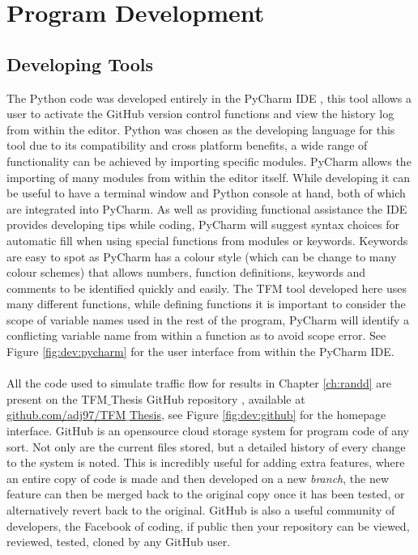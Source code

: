 \chapter{Program Development}
\label{ch:development}
\graphicspath{{image_directory/development/}}

\section{Developing Tools}

	The Python code was developed entirely in the PyCharm IDE \cite{PyCharm}, this tool allows a user to activate the GitHub version control functions and view the history log from within the editor. Python was chosen as the developing language for this tool due to its compatibility and cross platform benefits, a wide range of functionality can be achieved by importing specific modules. PyCharm allows the importing of many modules from within the editor itself. While developing it can be useful to have a terminal window and Python console at hand, both of which are integrated into PyCharm. As well as providing functional assistance the IDE provides developing tips while coding, PyCharm will suggest syntax choices for automatic fill when using special functions from modules or keywords. Keywords are easy to spot as PyCharm has a colour style (which can be change to many colour schemes) that allows numbers, function definitions, keywords and comments to be identified quickly and easily. The TFM tool developed here uses many different functions, while defining functions it is important to consider the scope of variable names used in the rest of the program, PyCharm will identify a conflicting variable name from within a function as to avoid scope error. See Figure \ref{fig:dev:pycharm} for the user interface from within the PyCharm IDE. 
	\\ \\
	All the code used to simulate traffic flow for results in Chapter \ref{ch:randd} are present on the TFM$\_$Thesis GitHub repository \cite{AndrewDixonGitHub}, available at \href{https://github.com/adj97/TFM_Thesis}{github.com/adj97/TFM$\_$Thesis}, see Figure \ref{fig:dev:github} for the homepage interface. GitHub is an opensource cloud storage system for program code of any sort. Not only are the current files stored, but a detailed history of every change to the system is noted. This is incredibly useful for adding extra features, where an entire copy of code is made and then developed on a new \emph{branch}, the new feature can then be merged back to the original copy once it has been tested, or alternatively revert back to the original. GitHub is also a useful community of developers, the Facebook of coding, if public then your repository can be viewed, reviewed, tested, cloned by any GitHub user. 

